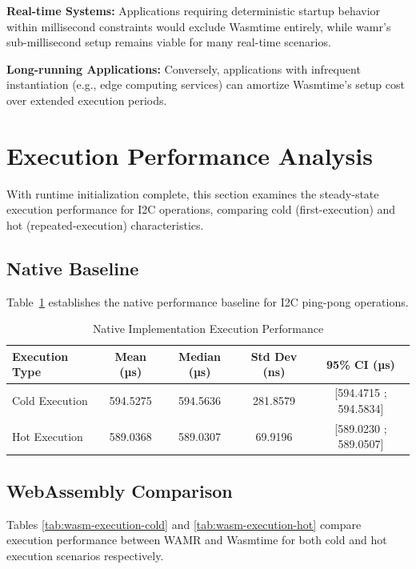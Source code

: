 \textbf{Real-time Systems:} Applications requiring deterministic startup behavior within millisecond constraints would exclude Wasmtime entirely, while \acrshort{wamr}'s sub-millisecond setup remains viable for many real-time scenarios.

\textbf{Long-running Applications:} Conversely, applications with infrequent instantiation (e.g., edge computing services) can amortize Wasmtime's setup cost over extended execution periods.

\section{Execution Performance Analysis}
\label{sec:eval-execution}

With runtime initialization complete, this section examines the steady-state execution performance for I2C operations, comparing cold (first-execution) and hot (repeated-execution) characteristics.

\subsection{Native Baseline}
\label{subsec:eval-execution-native}

Table~\ref{tab:native-execution} establishes the native performance baseline for I2C ping-pong operations.

\begin{table}[h]
    \centering
    \caption{Native Implementation Execution Performance}
    \label{tab:native-execution}
    \begin{tabular}{lcccc}
        \toprule
        \textbf{Execution Type} & \textbf{Mean (µs)} & \textbf{Median (µs)} & \textbf{Std Dev (ns)} & \textbf{95\% CI (µs)} \\
        \midrule
        Cold Execution  & 594.5275 & 594.5636 & 281.8579 & [594.4715 ; 594.5834] \\
        Hot Execution   & 589.0368 & 589.0307 & 69.9196 & [589.0230 ; 589.0507] \\
    \end{tabular}
\end{table}

\subsection{WebAssembly Comparison}
\label{subsec:eval-execution-wasm}

Tables \ref{tab:wasm-execution-cold} and \ref{tab:wasm-execution-hot} compare execution performance between WAMR and Wasmtime for both cold and hot execution scenarios respectively.

